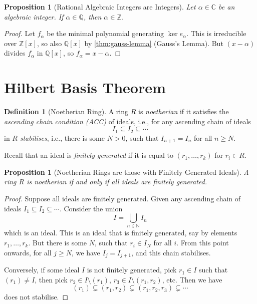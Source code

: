 \documentclass{article}
\newtheorem{proposition}[theorem]{Proposition}
\theoremstyle{definition}
\newtheorem{definition}[theorem]{Definition}
\theoremstyle{remark}
\newcommand{\pqty}[1]{\left(#1\right)}
\newcommand{\bqty}[1]{\left[#1\right]}
\newcommand{\ZZ}{\mathbb{Z}}
\newcommand{\QQ}{\mathbb{Q}}
\newcommand{\CC}{\mathbb{C}}
\newcommand{\NN}{\mathbb{N}}
\begin{document}
\begin{proposition}[Rational Algebraic Integers are Integers]
    \label{prop:rational-algebraic-integer}%
    Let \(\alpha \in \CC\) be an algebraic integer. If \(\alpha \in \QQ\), then \(\alpha \in \ZZ\).
\end{proposition}

\begin{proof}
    Let \(f_\alpha\) be the minimal polynomial generating \(\ker e_\alpha\). This is irreducible over \(\ZZ\bqty{x}\), so also \(\QQ\bqty{x}\) by \autoref{thm:gauss-lemma} (Gauss's Lemma). But \(\pqty{x - \alpha}\) divides \(f_\alpha\) in \(\QQ\bqty{x}\), so \(f_\alpha = x - \alpha\).
\end{proof}

\section{Hilbert Basis Theorem}

\begin{definition}[Noetherian Ring]
    \label{def:noetherian-ring}%
    A ring \(R\) is \emph{noetherian} if it satisfies the \emph{ascending chain condition (ACC)} of ideals, i.e., for any ascending chain of ideals
    \[
        I_1 \subseteq I_2 \subseteq \cdots
    \]
    in \(R\) \emph{stabilises}, i.e., there is some \(N > 0\), such that \(I_{n + 1} = I_n\) for all \(n \geq N\).
\end{definition}

Recall that an ideal is \emph{finitely generated} if it is equal to \(\pqty{r_1, \ldots, r_k}\) for \(r_i \in R\).

\begin{proposition}[Noetherian Rings are those with Finitely Generated Ideals]
    \label{prop:noetherian-ring-finitely-generated-ideal}%
    A ring \(R\) is noetherian if and only if all ideals are finitely generated.
\end{proposition}

\begin{proof}
    Suppose all ideals are finitely generated. Given any ascending chain of ideals \(I_1 \subseteq I_2 \subseteq \cdots\). Consider the union
    \[
        I = \bigcup_{n \in \NN} I_n
    \]
    which is an ideal. This is an ideal that is finitely generated, say by elements \(r_1, \ldots, r_k\). But there is some \(N\), such that \(r_i \in I_N\) for all \(i\). From this point onwards, for all \(j \geq N\), we have \(I_j = I_{j + 1}\), and this chain stabilises.

    Conversely, if some ideal \(I\) is not finitely generated, pick \(r_1 \in I\) such that \(\pqty{r_1} \neq I\), then pick \(r_2 \in I \setminus \pqty{r_1}\),   \(r_3 \in I \setminus \pqty{r_1, r_2}\), etc. Then we have
    \[
        \pqty{r_1} \subsetneq \pqty{r_1, r_2} \subsetneq \pqty{r_1, r_2, r_3} \subsetneq \cdots
    \]
    does not stabilise.
\end{proof}
\end{document}
